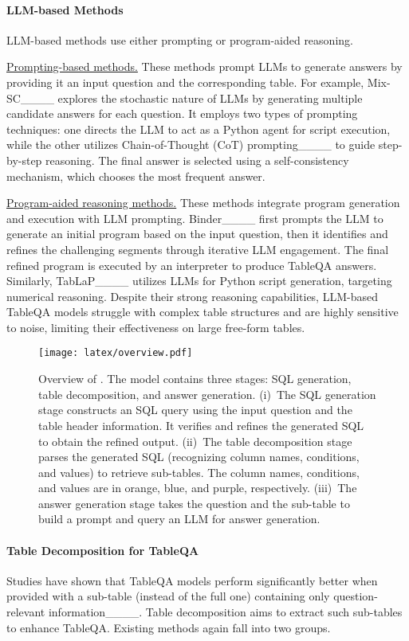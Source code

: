 \paragraph{LLM-based Methods} LLM-based methods use either prompting or program-aided reasoning.

\underline{Prompting-based methods.} These methods prompt LLMs to generate answers by providing it an input question and the corresponding table. For example, Mix-SC____ explores the stochastic nature of LLMs by generating multiple candidate answers for each question. It employs two types of prompting techniques: one directs the LLM to act as a Python agent for script execution, while the other utilizes Chain-of-Thought (CoT) prompting____ to guide step-by-step reasoning. The final answer is selected using a self-consistency mechanism, which chooses the most frequent answer. 

\underline{Program-aided reasoning methods.} These methods  integrate program generation and execution with LLM prompting.  Binder____ first prompts the LLM to generate an initial program based on the input question, then it identifies and refines the challenging segments through iterative LLM engagement. The final refined program is executed by an interpreter to produce TableQA answers. Similarly, TabLaP____ utilizes LLMs for Python script generation, targeting numerical reasoning.  Despite their strong reasoning capabilities, LLM-based TableQA models struggle with complex table structures and are highly sensitive to noise, limiting their effectiveness on large free-form tables.

\begin{figure*}[t]
     \centering
     \texttt{[image: latex/overview.pdf]}
     \caption{Overview of \model. The model contains three stages: SQL generation, table decomposition, and answer generation. (i)~The SQL generation stage constructs an SQL query using the input question and the table header information. It verifies and refines the generated SQL to obtain the refined output. (ii)~The table decomposition stage parses the generated SQL (recognizing column names, conditions, and values) to retrieve sub-tables. The column names, conditions, and values are in orange, blue, and purple, respectively. (iii)~The answer generation stage takes the question and the sub-table to build a  prompt and query an LLM for answer generation.}
     \label{fig:model_overview}
\end{figure*}

\paragraph{Table Decomposition for TableQA} Studies have shown that TableQA models perform significantly better when provided with a sub-table (instead of the full one) containing only question-relevant information____. Table decomposition aims to extract such sub-tables to enhance TableQA. Existing  methods again fall into two groups.

